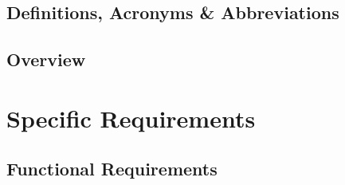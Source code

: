 \documentclass[11pt]{article}
\begin{document}
\subsection{Definitions, Acronyms \& Abbreviations}
\subsection{Overview}

\section{Specific Requirements}

\subsection{Functional Requirements}
\end{document}
